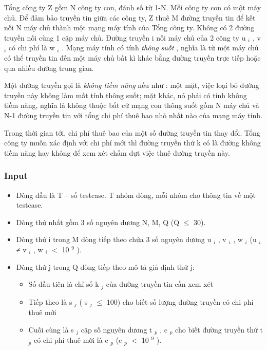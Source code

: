 

Tổng công ty Z gồm N công ty con, đánh số từ 1-N. Mỗi công ty con có một máy chủ. Để đảm bảo truyền tin giữa các công ty, Z thuê M đường truyền tin để kết nối N máy chủ thành một mạng máy tính của Tổng công ty. Không có 2 đường truyền nối cùng 1 cặp máy chủ. Đường truyền i nối máy chủ của 2 công ty u $_ i $ , v $_ i $ có chi phí là w $_ i $ . Mạng máy tính có tính \emph{ thông suốt } , nghĩa là từ một máy chủ có thể truyền tin đến một máy chủ bất kì khác bằng đường truyền trực tiếp hoặc qua nhiều đường trung gian.

Một đường truyền gọi là \emph{ không tiềm năng } nếu như : một mặt, việc loại bỏ đường truyền này không làm mất tính thông suốt; mặt khác, nó phải có tính không tiềm năng, nghĩa là không thuộc bất cứ mạng con thông suốt gồm N máy chủ và N-1 đường truyền tin với tổng chi phí thuê bao nhỏ nhất nào của mạng máy tính.

Trong thời gian tới, chi phí thuê bao của một số đường truyền tin thay đổi. Tổng công ty muốn xác định với chi phí mới thì đường truyền thứ k có là đường không tiềm năng hay không để xem xét chấm dựt việc thuê đường truyền này.

\subsubsection{Input}
\begin{itemize}
	\item Dòng đầu là T – số testcase. T nhóm dòng, mỗi nhóm cho thông tin về một testcase.
	\item Dòng thứ nhất gồm 3 số nguyên dương N, M, Q (Q  $\le$  30).
	\item Dòng thứ i trong M dòng tiếp theo chứa 3 số nguyên dương u $_ i $ , v $_ i $ , w $_ i $ (u $_ i $ ≠ v $_ i $ , w $_ i $ $<$ 10 $^ 9 $ ).
	\item Dòng thứ j trong Q dòng tiếp theo mô tả giả định thứ j:
\begin{itemize}
	\item Số đầu tiên là chỉ số k $_ j $ của đường truyền tin cần xem xét
	\item Tiếp theo là s $_ j $ ( s $_ j $  $\le$  100) cho biết số lượng đường truyền có chi phí thuê mới
	\item Cuối cùng là s $_ j $ cặp số nguyên dương t $_ p $ , c $_ p $ cho biết đường truyền thứ t $_ p $ có chi phí thuê mới là c $_ p $ (c $_ p $ $<$ 10 $^ 9 $ ).
\end{itemize}
\end{itemize}

